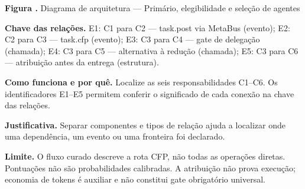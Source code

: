 {\small\textbf{Figura \thefigure.} Diagrama de arquitetura --- Primário, elegibilidade e seleção de agentes}\par\smallskip
{\footnotesize\textbf{Chave das relações.} E1: C1 para C2 --- task.post via MetaBus (evento); E2: C2 para C3 --- task.cfp (evento); E3: C3 para C4 --- gate de delegação (chamada); E4: C3 para C5 --- alternativa à redução (chamada); E5: C3 para C6 --- atribuição antes da entrega (estrutura).}\par\smallskip
\noindent\textbf{Como funciona e por quê.} Localize as seis responsabilidades C1--C6. Os identificadores E1--E5 permitem conferir o significado de cada conexão na chave das relações.\par
\noindent\textbf{Justificativa.} Separar componentes e tipos de relação ajuda a localizar onde uma dependência, um evento ou uma fronteira foi declarado.\par
\noindent\textbf{Limite.} O fluxo curado descreve a rota CFP, não todas as operações diretas. Pontuações não são probabilidades calibradas. A atribuição não prova execução; economia de tokens é auxiliar e não constitui gate obrigatório universal.\par\smallskip
{}
